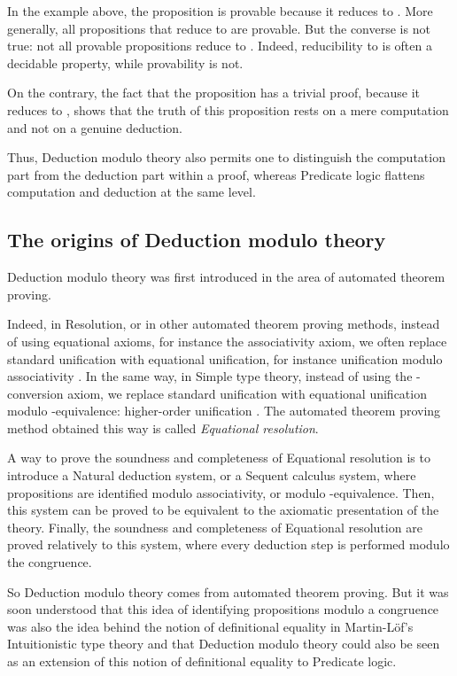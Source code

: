\documentclass{llncs}
\begin{document}
In the example above, the proposition  is provable because
it reduces to . More generally, all propositions that reduce to 
 are provable. But the converse is not true: not all provable 
propositions reduce to .  Indeed, reducibility to  is often a 
decidable property,
while provability is not.

On the contrary, the fact that the proposition  has a
trivial proof, because it reduces to , 
shows that the truth of this proposition rests
on a mere computation and not on a genuine deduction. 

Thus, Deduction modulo theory also permits one to distinguish
the computation part from the deduction part
within a proof, whereas
Predicate logic
flattens computation and deduction at the same level.

\subsection{The origins of Deduction modulo theory}

Deduction modulo theory was first introduced in the area of 
automated theorem proving. 

Indeed, in Resolution, or in other automated theorem proving methods, 
instead of using equational
axioms, for instance the associativity axiom, we often replace standard
unification with equational unification, for instance unification
modulo associativity \cite{Plotkin}.  In the same
way, in Simple type theory, instead of using the -conversion
axiom, we replace standard unification with equational
unification modulo -equivalence:
higher-order unification \cite{Andrews71,Huet73,Huet75}. The 
automated theorem proving method obtained this way is called {\em Equational 
resolution}. 

A way to prove the soundness and completeness of Equational resolution
is to introduce a Natural deduction system, or a Sequent calculus
system, where propositions are identified modulo associativity, or
modulo -equivalence. Then, this system can be proved to be
equivalent to the axiomatic presentation of the theory.  Finally, the
soundness and completeness of Equational resolution are proved
relatively to this system, where every deduction step is performed
modulo the congruence.

So Deduction modulo theory comes from automated theorem proving.  But
it was soon understood that this idea of identifying propositions
modulo a congruence was also the idea behind the notion of
definitional equality in Martin-L\"of's Intuitionistic type theory
\cite{MartinLof} and that Deduction modulo theory could also be seen
as an extension of this notion of definitional equality to Predicate
logic.
\end{document}
